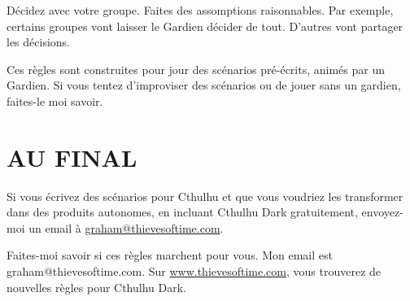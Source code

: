 \documentclass[11pt]{article}
\begin{document}
Décidez avec votre groupe. Faites des assomptions raisonnables. Par exemple, certains groupes vont laisser le Gardien décider de tout. D'autres vont partager les décisions.

Ces règles sont construites pour jour des scénarios pré-écrits, animés par un Gardien. Si vous tentez d'improviser des scénarios ou de jouer sans un gardien, faites-le moi savoir.

\section{AU FINAL}

Si vous écrivez des scénarios pour Cthulhu et que vous voudriez les transformer dans des produits autonomes, en incluant Cthulhu Dark gratuitement, envoyez-moi un email à \href{mailto:graham@thievesoftime.com}{graham@thievesoftime.com}.

Faites-moi savoir si ces règles marchent pour vous. Mon email est graham@thievesoftime.com. Sur \href{https://thievesoftime.bigcartel.com/}{www.thievesoftime.com}, vous trouverez de nouvelles règles pour Cthulhu Dark.

\newpage

\tableofcontents
\end{document}
